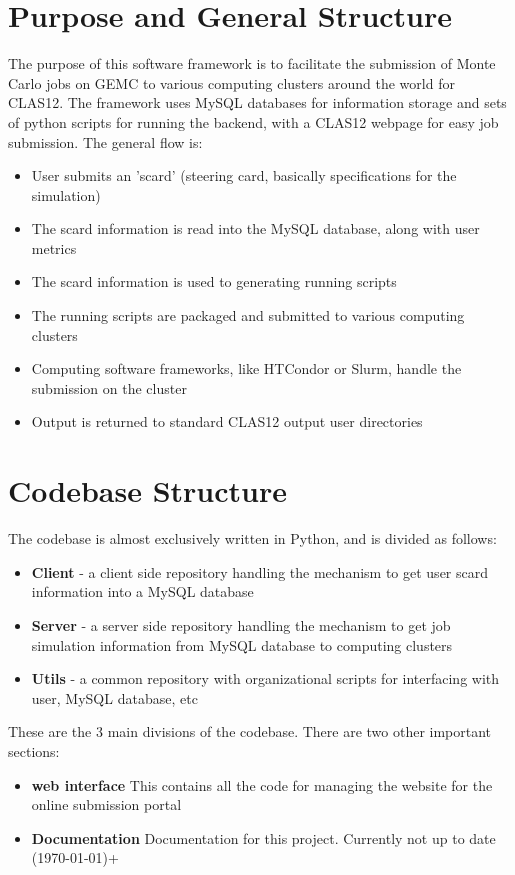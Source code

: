 \section{Purpose and General Structure}

The purpose of this software framework is to facilitate the submission of Monte Carlo jobs on GEMC to various computing clusters around the world for CLAS12. The framework uses MySQL databases for information storage and sets of python scripts for running the backend, with a CLAS12 webpage for easy job submission. The general flow is:
\begin{itemize}
  \item User submits an 'scard' (steering card, basically specifications for the simulation)
  \item The scard information is read into the MySQL database, along with user metrics
  \item The scard information is used to generating running scripts 
  \item The running scripts are packaged and submitted to various computing clusters
  \item Computing software frameworks, like HTCondor or Slurm, handle the submission on the cluster
  \item Output is returned to standard CLAS12 output user directories
\end{itemize}


\section{Codebase Structure}
The codebase is almost exclusively written in Python, and is divided as follows:
\begin{itemize}
  \item \textbf{Client} - a client side repository handling the mechanism to get user scard information into a MySQL database
  \item \textbf{Server} - a server side repository handling the mechanism to get job simulation information from MySQL database to computing clusters
  \item \textbf{Utils} - a common repository with organizational scripts for interfacing with user, MySQL database, etc
\end{itemize}
These are the 3 main divisions of the codebase. There are two other important sections:
  \begin{itemize}
    \item \textbf{web interface} This contains all the code for managing the website for the online submission portal
    \item \textbf{Documentation} Documentation for this project. Currently not up to date (\today)+
  \end{itemize}


